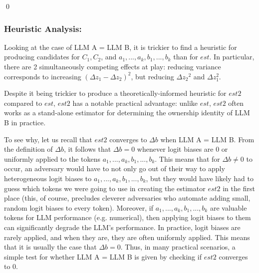 \documentclass{article}
\begin{document}
\qed 



\subsubsection*{Heuristic Analysis:}

Looking at the case of LLM A = LLM B, it is trickier to find a heuristic for producing candidates for $\displaystyle C_{1} ,C_{2}$, and $\displaystyle a_{1} ,...,a_{k} ,b_{1} ,...,b_{k}$ than for $\displaystyle est$. In particular, there are 2 simultaneously competing effects at play: reducing variance corresponds to increasing $\displaystyle \left( \Delta z_{1} -\Delta z_{2}\right)^{2}$, but reducing $\displaystyle \Delta z{_{2}}^{2}$ and $\displaystyle \Delta z_{1}^{2}$.



Despite it being trickier to produce a theoretically-informed heuristic for $\displaystyle est2$ compared to $\displaystyle est$, $\displaystyle est2$ has a notable practical advantage: unlike $\displaystyle est$, $\displaystyle est2$ often works as a stand-alone estimator for determining the ownership identity of LLM B in practice.



To see why, let us recall that $\displaystyle est2$ converges to $\displaystyle \Delta b$ when LLM A = LLM B. From the definition of $\displaystyle \Delta b$, it follows that $\displaystyle \Delta b=0$ whenever logit biases are 0 or uniformly applied to the tokens $\displaystyle a_{1} ,...,a_{k} ,b_{1} ,...,b_{k}$. This means that for $\displaystyle \Delta b\neq 0$ to occur, an adversary would have to not only go out of their way to apply heterogeneous logit biases to $\displaystyle a_{1} ,...,a_{k} ,b_{1} ,...,b_{k}$, but they would have likely had to guess which tokens we were going to use in creating the estimator $\displaystyle est2$ in the first place (this, of course, precludes cleverer adversaries who automate adding small, random logit biases to every token). Moreover, if $\displaystyle a_{1} ,...,a_{k} ,b_{1} ,...,b_{k}$ are valuable tokens for LLM performance (e.g. numerical), then applying logit biases to them can significantly degrade the LLM's performance. In practice, logit biases are rarely applied, and when they are, they are often uniformly applied. This means that it is usually the case that $\displaystyle \Delta b=0$. Thus, in many practical scenarios, a simple test for whether LLM A = LLM B is given by checking if $\displaystyle est2$ converges to 0.
\end{document}
